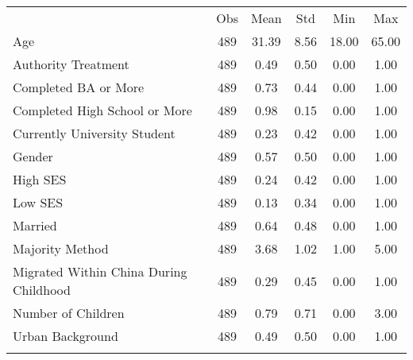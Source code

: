 \begin{center}
\begin{tabular}{lccccc}
\hline \noalign{\smallskip} & Obs & Mean & Std & Min & Max\\
\noalign{\smallskip}\hline \noalign{\smallskip}Age & 489 & 31.39 & 8.56 & 18.00 & 65.00\\
Authority Treatment & 489 & 0.49 & 0.50 & 0.00 & 1.00\\
Completed BA or More & 489 & 0.73 & 0.44 & 0.00 & 1.00\\
Completed High School or More & 489 & 0.98 & 0.15 & 0.00 & 1.00\\
Currently University Student & 489 & 0.23 & 0.42 & 0.00 & 1.00\\
Gender & 489 & 0.57 & 0.50 & 0.00 & 1.00\\
High SES & 489 & 0.24 & 0.42 & 0.00 & 1.00\\
Low SES & 489 & 0.13 & 0.34 & 0.00 & 1.00\\
Married & 489 & 0.64 & 0.48 & 0.00 & 1.00\\
Majority Method & 489 & 3.68 & 1.02 & 1.00 & 5.00\\
Migrated Within China During Childhood & 489 & 0.29 & 0.45 & 0.00 & 1.00\\
Number of Children & 489 & 0.79 & 0.71 & 0.00 & 3.00\\
Urban Background & 489 & 0.49 & 0.50 & 0.00 & 1.00\\
\noalign{\smallskip}\hline\end{tabular}\\
\end{center}
